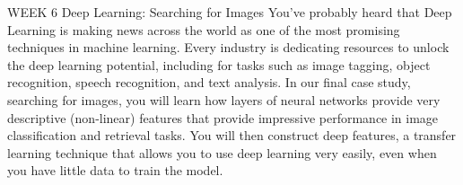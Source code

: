 WEEK 6
Deep Learning: Searching for Images
You’ve probably heard that Deep Learning is making news across the world as one of the most promising techniques in machine learning. Every industry is dedicating resources to unlock the deep learning potential, including for tasks such as image tagging, object recognition, speech recognition, and text analysis.
In our final case study, searching for images, you will learn how layers of neural networks provide very descriptive (non-linear) features that provide impressive performance in image classification and retrieval tasks. You will then construct deep features, a transfer learning technique that allows you to use deep learning very easily, even when you have little data to train the model.

